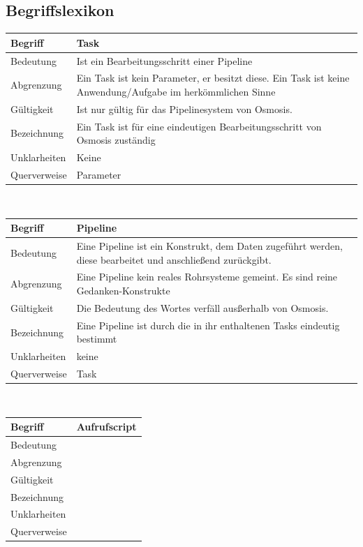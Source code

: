 \documentclass[a4paper,10pt]{scrartcl}
\begin{document}
\subsection{Begriffslexikon}

\begin{tabular}{|p{5cm}|p{10cm}|}
\hline Begriff & Task \\ 
\hline Bedeutung & Ist ein Bearbeitungsschritt einer Pipeline\\ 
\hline Abgrenzung & Ein Task ist kein Parameter, er besitzt diese. Ein Task ist keine Anwendung/Aufgabe im herkömmlichen Sinne \\ 
\hline Gültigkeit & Ist nur gültig für das Pipelinesystem von Osmosis. \\ 
\hline Bezeichnung & Ein Task ist für eine eindeutigen Bearbeitungsschritt von Osmosis zuständig\\ 
\hline Unklarheiten & Keine \\ 
\hline Querverweise & Parameter\\ 
\hline 
\end{tabular}
\\
\begin{tabular}{|p{5cm}|p{10cm}|}
\hline Begriff & Pipeline \\ 
\hline Bedeutung & Eine Pipeline ist ein Konstrukt, dem Daten zugeführt werden, diese bearbeitet und anschließend zurückgibt.  \\ 
\hline Abgrenzung & Eine Pipeline kein reales Rohrsysteme gemeint. Es sind reine Gedanken-Konstrukte \\ 
\hline Gültigkeit & Die Bedeutung des Wortes verfäll ausßerhalb von Osmosis. \\ 
\hline Bezeichnung & Eine Pipeline ist durch die in ihr enthaltenen Tasks eindeutig bestimmt \\ 
\hline Unklarheiten & keine \\ 
\hline Querverweise & Task \\ 
\hline 
\end{tabular}
\\
\begin{tabular}{|p{5cm}|p{10cm}|}
\hline Begriff & Aufrufscript \\ 
\hline Bedeutung &  \\ 
\hline Abgrenzung &  \\ 
\hline Gültigkeit &  \\ 
\hline Bezeichnung &  \\ 
\hline Unklarheiten &  \\ 
\hline Querverweise &  \\ 
\hline 
\end{tabular}
\end{document}
